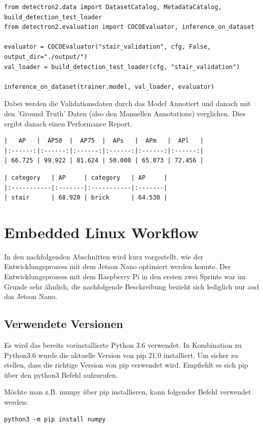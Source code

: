 \begin{verbatim}
from detectron2.data import DatasetCatalog, MetadataCatalog, build_detection_test_loader
from detectron2.evaluation import COCOEvaluator, inference_on_dataset

evaluator = COCOEvaluator("stair_validation", cfg, False, output_dir="./output/")
val_loader = build_detection_test_loader(cfg, "stair_validation")

inference_on_dataset(trainer.model, val_loader, evaluator)
\end{verbatim}

Dabei werden die Validationsdaten durch das Model Annotiert und danach mit den 'Ground Truth' Daten 
(also den Manuellen Annotations) verglichen. Dies ergibt danach einen Performance Report.

\begin{verbatim}
|   AP   |  AP50  |  AP75  |  APs   |  APm   |  APl   |
|:------:|:------:|:------:|:------:|:------:|:------:|
| 66.725 | 99.922 | 81.624 | 50.000 | 65.073 | 72.456 |
\end{verbatim}

\begin{verbatim}
| category   | AP     | category   | AP     |
|:-----------|:-------|:-----------|:-------|
| stair      | 68.920 | brick      | 64.530 |
\end{verbatim}

\section{Embedded Linux Workflow}
In den nachfolgenden Abschnitten wird kurz vorgestellt, wie der Entwicklungsprozess mit dem Jetson Nano optimiert werden konnte. Der Entwicklungsprozess mit dem Raspberry Pi in den ersten zwei Sprints war im Grunde sehr ähnlich, die nachfolgende Beschreibung bezieht sich lediglich nur aud das Jetson Nano.

\subsection{Verwendete Versionen}
Es wird das bereits vorinstallierte Python 3.6 verwendet. In Kombination zu Python3.6 wurde die aktuelle Version von pip 21.0 installiert. Um sicher zu stellen, dass die richtige Version von pip verwendet wird. Empfiehlt es sich pip über den python3 Befehl aufzurufen.

Möchte man z.B. numpy über pip installieren, kann folgender Befehl verwendet werden:
\begin{verbatim}
python3 -m pip install numpy
\end{verbatim}

